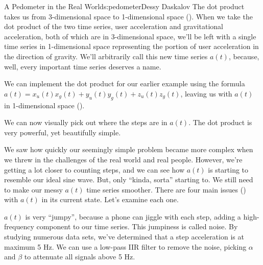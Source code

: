 \begin{aosachapter}{A Pedometer in the Real World}{s:pedometer}{Dessy Daskalov}
The dot product takes us from 3-dimensional space to 1-dimensional space
(). When we take the dot product
of the two time series, user acceleration and gravitational
acceleration, both of which are in 3-dimensional space, we'll be left
with a single time series in 1-dimensional space representing the
portion of user acceleration in the direction of gravity. We'll
arbitrarily call this new time series $a(t)$, because, well, every
important time series deserves a name.


\label{implementing-the-dot-product}

We can implement the dot product for our earlier example using the
formula $a(t) = x_{u}(t)x_{g}(t) + y_{u}(t)y_{g}(t) + z_{u}(t)z_{g}(t)$,
leaving us with $a(t)$ in 1-dimensional space
().


We can now visually pick out where the steps are in $a(t)$. The dot
product is very powerful, yet beautifully simple.

\label{solutions-in-the-real-world}

We saw how quickly our seemingly simple problem became more complex when
we threw in the challenges of the real world and real people. However,
we're getting a lot closer to counting steps, and we can see how $a(t)$
is starting to resemble our ideal sine wave. But, only ``kinda, sorta''
starting to. We still need to make our messy $a(t)$ time series
smoother. There are four main issues
() with $a(t)$ in its current state.
Let's examine each one.


\label{jumpy-peaks}

$a(t)$ is very ``jumpy'', because a phone can jiggle with each step,
adding a high-frequency component to our time series. This jumpiness is
called noise. By studying numerous data sets, we've determined that a
step acceleration is at maximum 5 Hz. We can use a low-pass IIR filter
to remove the noise, picking $\alpha$ and $\beta$ to attenuate all
signals above 5 Hz.


\end{aosachapter}
